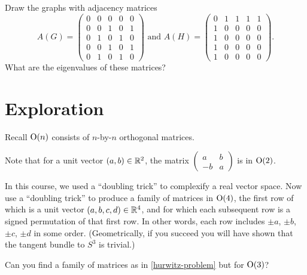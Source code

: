 \documentclass{homework}
\begin{document}
\begin{problem}
  Draw the graphs with adjacency matrices
  \[A(G) = \left(\begin{array}{rrrrr}
0 & 0 & 0 & 0 & 0 \\
0 & 0 & 1 & 0 & 1 \\
0 & 1 & 0 & 1 & 0 \\
0 & 0 & 1 & 0 & 1 \\
0 & 1 & 0 & 1 & 0
\end{array}\right)
\mbox{ and } A(H) = \left(\begin{array}{rrrrr}
0 & 1 & 1 & 1 & 1 \\
1 & 0 & 0 & 0 & 0 \\
1 & 0 & 0 & 0 & 0 \\
1 & 0 & 0 & 0 & 0 \\
1 & 0 & 0 & 0 & 0
                          \end{array}\right).
                      \]
                      What are the eigenvalues of these matrices?
\end{problem}

\section{Exploration}

\begin{problem}\label{hurwitz-problem}Recall $\operatorname{O}(n)$ consists of $n$-by-$n$ orthogonal matrices.

  Note that for a unit vector $(a,b) \in \mathbb{R}^2$, the matrix $\displaystyle\begin{pmatrix} a & b \\ -b & a \end{pmatrix}$ is in $\operatorname{O}(2)$.

  In this course, we used a ``doubling trick'' to complexify a real
  vector space.  Now use a ``doubling trick'' to produce a family of
  matrices in $\operatorname{O}(4)$, the first row of which is a unit vector
  $(a,b,c,d) \in \mathbb{R}^4$, and for which each subsequent row is a signed
  permutation of that first row.  In other words, each row includes
  $\pm a$, $\pm b$, $\pm c$, $\pm d$ in some order.  (Geometrically,
  if you succeed you will have shown that the tangent bundle to $S^3$
  is trivial.)
\end{problem}

\begin{problem}
  Can you find a family of matrices as in \ref{hurwitz-problem} but for $\operatorname{O}(3)$?
\end{problem}
\end{document}

